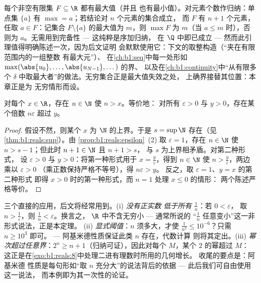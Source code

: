 \begin{example}\label{ex:b1:reals:finitemax}
每个非空有限集 $F \subseteq \R$ 都有最大值（并且
也有最小值）。对元素个数作归纳：单点集
$\{a\}$ 有 $\max = a$；若结论对 $n$ 个元素的集合成立，
而 $F$ 有 $n + 1$ 个元素，任取 $a \in F$：记集合 $F
\setminus \{a\}$ 的最大值为 $m$，则 $\max F$ 为 $m$（当 $a
\leq m$ 时），否则为 $a$。无需用到完备性 --- 这纯粹是序加归纳，
在 $\Q$ 中即已成立 --- 然而此引理值得明确陈述一次，因为后文证明
会默默使用它：下文的取整构造（“夹在有限范围内的一组整数
有最大元”）、
在\cref{ch:b1:seq}中每一处形如
$\max(\abs{u_0}, \dots, \abs{u_{N-1}}, \dots)$ 的界、
以及在\cref{ch:b1:continuity}中“从有限多个
$\delta$ 中取最大者”的做法。无穷集合正是最大值失效之处，
上确界接替其位置：本章正是为
无穷情形而设。
\end{example}

\begin{theorem}[阿基米德性质]\label{thm:b1:reals:archimedes}
对每个 $x \in \R$，存在 $n \in \N$ 使 $n > x$。等价地：
对所有 $\varepsilon > 0$ 与 $y > 0$，存在某个倍数 $n\varepsilon$
超过 $y$。
\end{theorem}

\begin{proof}
假设不然，则某个 $x$ 为 $\N$ 的上界。于是 $s = \sup \N$
存在（见\cref{thm:b1:reals:sup}）。由
\cref{prop:b1:reals:epsilon}~(2) 取 $\varepsilon = 1$，存在 $n
\in \N$ 使 $n > s - 1$；但此时 $n + 1 \in \N$ 且 $n + 1 > s$，
与 $s$ 为上界相矛盾。对第二种形式，
设 $\varepsilon > 0$ 与 $y > 0$：将第一种形式用于 $x
= \frac{y}{\varepsilon}$，得到 $n \in \N$ 使 $n >
\frac{y}{\varepsilon}$，两边乘以 $\varepsilon > 0$
（乘正数保持严格不等号），得 $n\varepsilon > y$。
反之，取 $\varepsilon = 1$、$y = x$ 的第二种形式
即得 $x > 0$ 时的第一种形式，而 $n = 1$ 处理 $x \leq 0$ 的情形：
两个陈述严格等价。
\end{proof}

\begin{example}[阿基米德性质的应用]\label{ex:b1:reals:archimedeswork}
三个直接的应用，后文将经常用到。(i) \emph{没有正实数
低于所有 $\frac1n$}：若 $0 < \varepsilon$，
取 $n > \frac1\varepsilon$，则 $\frac1n < \varepsilon$。换言之，
$\R$ 中不含无穷小 --- 通常所说的
“$\frac1n$ 任意变小”这一非形式说法，正是本定理。
(ii) \emph{显式阈值}：$n$ 须多大，才使
$\frac{1}{n^2} \leq 10^{-6}$？只需 $n \geq 10^3$ 即可。
--- 阿基米德性质保证此类 $n$ 存在，代数计算
则将其定出。(iii) \emph{幂次超过任意界}：$2^n \geq n +
1$（归纳可证），因此对每个 $M$，某个 $2$ 的幂超过 $M$：
这正是在\cref{exo:b1:reals:8}中处理二进有理数时所用的几何增长。
收尾的要点是：阿基米德
性质是每句形如“取
$n$ 充分大”的说法背后的依据 --- 此后我们可自由使用这一说法，
而本例即为其一次性的论证。
\end{example}

